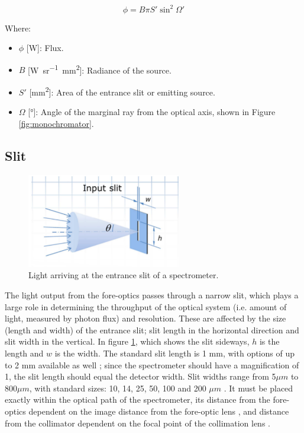 \documentclass{article}
\begin{document}
\begin{equation} \label{eq:flux-expanded}
    \phi = B\pi S'\sin^2\Omega'
\end{equation}

Where:
\begin{itemize}[label={}]
    \item $\phi$ [\si{\watt}]: Flux.
    \item $B$ [\si{\watt\per\steradian\mm\squared}]: Radiance of the source.
    \item $S'$ [\si{\mm\squared}]: Area of the entrance slit or emitting source.
    \item $\Omega$ [\si{\degree}]: Angle of the marginal ray from the optical axis, shown in Figure \ref{fig:monochromator}.
\end{itemize}

\subsection{Slit}
\begin{figure}[H]
\centering
\includegraphics[width=0.6\textwidth]{figures/entrance slit.PNG}
\caption{Light arriving at the entrance slit of a spectrometer. \cite{Ibsen_photonics_coupling}}
\label{fig:entrance-slit}
\end{figure}

The light output from the fore-optics passes through a narrow slit, which plays a large role in determining the throughput of the optical system (i.e. amount of light, measured by photon flux) and resolution. These are affected by the size (length and width) of the entrance slit; slit length in the horizontal direction and slit width in the vertical. In figure \ref{fig:entrance-slit}, which shows the slit sideways, $h$ is the length and $w$ is the width. The standard slit length is 1 mm, with options of up to 2 mm available as well \cite{B&W_Tek}; since the spectrometer should have a magnification of 1, the slit length should equal the detector width. Slit widths range from 5$\mu m$ to 800$\mu m$, with standard sizes: 10, 14, 25, 50, 100 and 200 $\mu m$ \cite{StellarNet}. It must be placed exactly within the optical path of the spectrometer, its distance from the fore-optics dependent on the image distance from the fore-optic lens \cite{Horiba_entrance_optics}, and distance from the collimator dependent on the focal point of the collimation lens \cite{Ibsen_photonics_design}.
\end{document}
